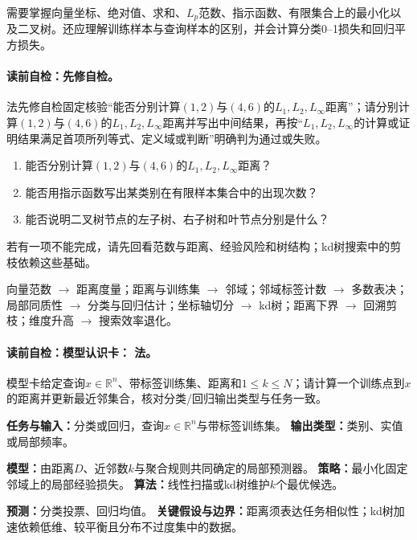 \label{struct:V2-C02-CH02}
\begin{prerequisitebox}
需要掌握向量坐标、绝对值、求和、$L_p$范数、指示函数、有限集合上的最小化以及二叉树。还应理解训练样本与查询样本的区别，并会计算分类0--1损失和回归平方损失。
\end{prerequisitebox}

\label{struct:V2-C02-CH03}
\paragraph{读前自检：先修自检。}\kNN{}法先修自检固定核验“能否分别计算$(1,2)$与$(4,6)$的$L_1,L_2,L_\infty$距离”；请分别计算$(1,2)$与$(4,6)$的$L_1,L_2,L_\infty$距离并写出中间结果，再按“$L_1,L_2,L_\infty$的计算或证明结果满足首项所列等式、定义域或判断”明确判为通过或失败。\par

\begin{precheckbox}
\begin{enumerate}[leftmargin=2.2em]
  \item 能否分别计算$(1,2)$与$(4,6)$的$L_1,L_2,L_\infty$距离？
  \item 能否用指示函数写出某类别在有限样本集合中的出现次数？
  \item 能否说明二叉树节点的左子树、右子树和叶节点分别是什么？
\end{enumerate}
若有一项不能完成，请先回看范数与距离、经验风险和树结构；kd树搜索中的剪枝依赖这些基础。
\end{precheckbox}

\label{struct:V2-C02-CH04}
\begin{dependencybox}
向量范数 $\to$ 距离度量；距离与训练集 $\to$ 邻域；邻域标签计数 $\to$ 多数表决；局部同质性 $\to$ 分类与回归估计；坐标轴切分 $\to$ kd树；距离下界 $\to$ 回溯剪枝；维度升高 $\to$ 搜索效率退化。
\end{dependencybox}

\paragraph{读前自检：模型认识卡： 法。}\kNN{}模型卡给定查询$x\in\mathbb R^n$、带标签训练集、距离和$1\le k\le N$；请计算一个训练点到$x$的距离并更新最近邻集合，核对分类/回归输出类型与任务一致。\par

\begin{keypointbox}[title=模型认识卡：\kNN{}法]
\textbf{任务与输入：}分类或回归，查询$x\in\mathbb R^n$与带标签训练集。\quad
\textbf{输出类型：}类别、实值或局部频率。\par
\textbf{模型：}由距离$D$、近邻数$k$与聚合规则共同确定的局部预测器。\quad
\textbf{策略：}最小化固定邻域上的局部经验损失。\quad
\textbf{算法：}线性扫描或kd树维护$k$个最优候选。\par
\textbf{预测：}分类投票、回归均值。\quad
\textbf{关键假设与边界：}距离须表达任务相似性；kd树加速依赖低维、较平衡且分布不过度集中的数据。
\end{keypointbox}

